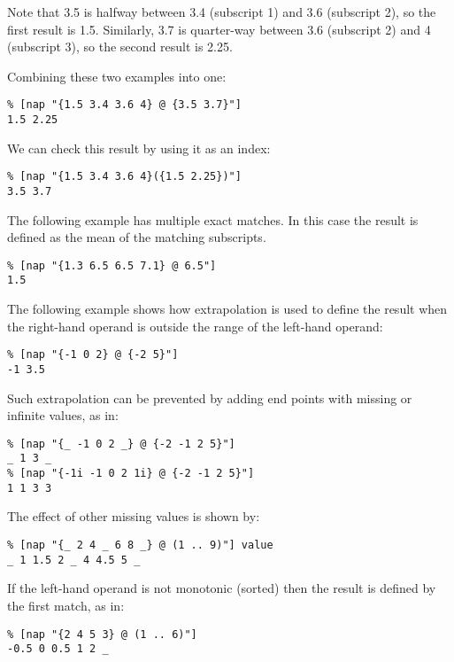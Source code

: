   \par Note that 3.5 is halfway between 3.4 (subscript 1) and 3.6
  (subscript 2), so the first result is 1.5. Similarly, 3.7 is
  quarter-way between 3.6 (subscript 2) and 4 (subscript 3), so the
  second result is 2.25.
  \par Combining these two examples into one:
  \begin{verbatim}
% [nap "{1.5 3.4 3.6 4} @ {3.5 3.7}"]
1.5 2.25
\end{verbatim}

  \par We can check this result by using it as an index:
  \begin{verbatim}
% [nap "{1.5 3.4 3.6 4}({1.5 2.25})"]
3.5 3.7
\end{verbatim}

  \par The following example has multiple exact matches. In this case the
  result is defined as the mean of the matching subscripts.
  \begin{verbatim}
% [nap "{1.3 6.5 6.5 7.1} @ 6.5"]
1.5
\end{verbatim}

  \par The following example shows how extrapolation is used to define
  the result when the right-hand operand is outside the range of the
  left-hand operand:
  \begin{verbatim}
% [nap "{-1 0 2} @ {-2 5}"]
-1 3.5
\end{verbatim}

  \par Such extrapolation can be prevented by adding end points with
  missing or infinite values, as in:
  \begin{verbatim}
% [nap "{_ -1 0 2 _} @ {-2 -1 2 5}"]
_ 1 3 _
% [nap "{-1i -1 0 2 1i} @ {-2 -1 2 5}"]
1 1 3 3
\end{verbatim}

  \par The effect of other missing values is shown by:
  \begin{verbatim}
% [nap "{_ 2 4 _ 6 8 _} @ (1 .. 9)"] value
_ 1 1.5 2 _ 4 4.5 5 _
\end{verbatim}

  \par If the left-hand operand is not monotonic (sorted) then the result
  is defined by the first match, as in:
  \begin{verbatim}
% [nap "{2 4 5 3} @ (1 .. 6)"]
-0.5 0 0.5 1 2 _
\end{verbatim}

